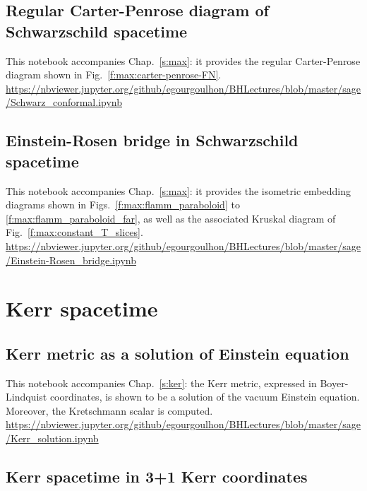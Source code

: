 \subsection{Regular Carter-Penrose diagram of Schwarzschild spacetime}
\label{s:sam:reg_Carter-Penrose}
This notebook accompanies Chap.~\ref{s:max}: it provides the regular
Carter-Penrose diagram shown in Fig.~\ref{f:max:carter-penrose-FN}.\\[1ex]
{\footnotesize
\url{https://nbviewer.jupyter.org/github/egourgoulhon/BHLectures/blob/master/sage/Schwarz_conformal.ipynb}
}

\subsection{Einstein-Rosen bridge in Schwarzschild spacetime}
\label{s:sam:Einstein-Rosen}
This notebook accompanies Chap.~\ref{s:max}: it provides the
isometric embedding diagrams shown in Figs.~\ref{f:max:flamm_paraboloid}
to \ref{f:max:flamm_paraboloid_far}, as well as the associated
Kruskal diagram of Fig.~\ref{f:max:constant_T_slices}.\\[1ex]
{\footnotesize
\url{https://nbviewer.jupyter.org/github/egourgoulhon/BHLectures/blob/master/sage/Einstein-Rosen_bridge.ipynb}
}


\section{Kerr spacetime}

\subsection{Kerr metric as a solution of Einstein equation} \label{s:sam:Kerr_solution}

This notebook accompanies Chap.~\ref{s:ker}: the Kerr metric, expressed in Boyer-Lindquist
coordinates, is shown to be a solution of the vacuum Einstein equation. Moreover, the Kretschmann scalar is computed.\\[1ex]
{\footnotesize
\url{https://nbviewer.jupyter.org/github/egourgoulhon/BHLectures/blob/master/sage/Kerr_solution.ipynb}
}

\subsection{Kerr spacetime in 3+1 Kerr coordinates} \label{s:sam:Kerr_Kerr_coord}


